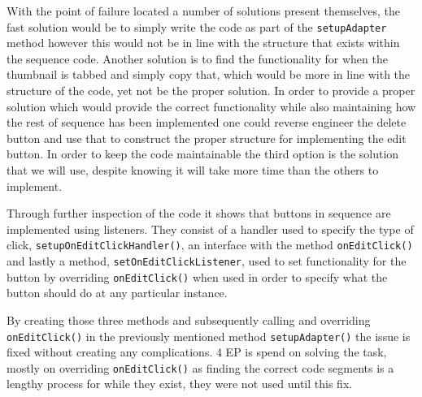 With the point of failure located a number of solutions present themselves, the fast solution would be to simply write the code as part of the \texttt{setupAdapter} method however this would not be in line with the structure that exists within the sequence code.
Another solution is to find the functionality for when the thumbnail is tabbed and simply copy that, which would be more in line with the structure of the code, yet not be the proper solution.
In order to provide a proper solution which would provide the correct functionality while also maintaining how the rest of sequence has been implemented one could reverse engineer the delete button and use that to construct the proper structure for implementing the edit button.
In order to keep the code maintainable the third option is the solution that we will use, despite knowing it will take more time than the others to implement.

Through further inspection of the code it shows that buttons in sequence are implemented using listeners.
They consist of a handler used to specify the type of click, \texttt{setupOnEditClickHandler()}, an interface with the method \texttt{onEditClick()} and lastly a method, \texttt{setOnEditClickListener}, used to set functionality for the button by overriding \texttt{onEditClick()} when used in order to specify what the button should do at any particular instance.

By creating those three methods and subsequently calling and overriding \texttt{onEditClick()} in the previously mentioned method \texttt{setupAdapter()} the issue is fixed without creating any complications.
4 EP is spend on solving the task, mostly on overriding \texttt{onEditClick()} as finding the correct code segments is a lengthy process for while they exist, they were not used until this fix.